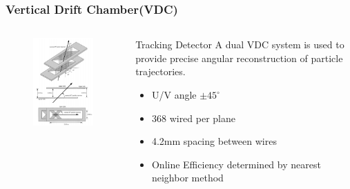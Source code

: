 \documentclass{beamer}
\begin{document}
\begin{frame}
\frametitle{Vertical Drift Chamber(VDC)}
	\begin{columns}
		\begin{figure}
			\includegraphics[width=5cm]{../images/VDC}
		\end{figure}	
		\begin{block}{Tracking Detector}
		A dual VDC system is used to provide precise angular reconstruction of particle trajectories.
		\begin{itemize}
			\item U/V angle $\pm 45 ^\circ$
			\item 368 wired per plane
			\item 4.2mm spacing between wires
			\item Online Efficiency determined by nearest neighbor method \cite{nim}
		\end{itemize}
	\end{block}
	\end{columns}
\end{frame}
\end{document}
